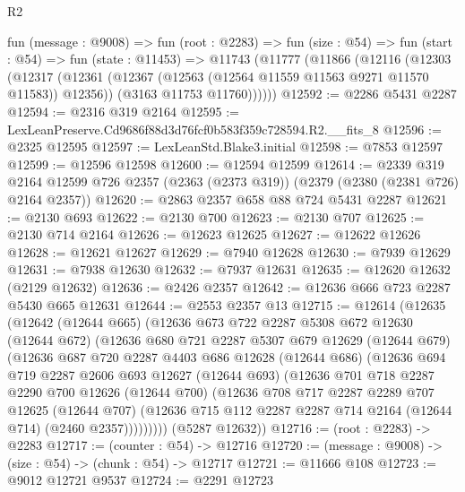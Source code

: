 \begin{lexlean}{R2}
\begin{coremodule}
  fun (message : @9008) =>
  fun (root : @2283) =>
  fun (size : @54) =>
  fun (start : @54) =>
  fun (state : @11453) =>
  @11743
    (@11777
      (@11866
        (@12116
          (@12303
            (@12317
              (@12361 (@12367 (@12563 (@12564 @11559 @11563 @9271 @11570 @11583)) @12356))
              (@3163 @11753 @11760))))))
@12592 := @2286 @5431 @2287
@12594 := @2316 @319 @2164
@12595 := LexLeanPreserve.Cd9686f88d3d76fcf0b583f359c728594.R2.__fits_8
@12596 := @2325 @12595
@12597 := LexLeanStd.Blake3.initial
@12598 := @7853 @12597
@12599 := @12596 @12598
@12600 := @12594 @12599
@12614 := @2339
    @319
    @2164
    @12599
    @726
    @2357
    (@2363 (@2373 @319))
    (@2379 (@2380 (@2381 @726) @2164 @2357))
@12620 := @2863 @2357 @658 @88 @724 @5431 @2287
@12621 := @2130 @693
@12622 := @2130 @700
@12623 := @2130 @707
@12625 := @2130 @714 @2164
@12626 := @12623 @12625
@12627 := @12622 @12626
@12628 := @12621 @12627
@12629 := @7940 @12628
@12630 := @7939 @12629
@12631 := @7938 @12630
@12632 := @7937 @12631
@12635 := @12620 @12632 (@2129 @12632)
@12636 := @2426 @2357
@12642 := @12636 @666 @723 @2287 @5430 @665 @12631
@12644 := @2553 @2357 @13
@12715 := @12614
    (@12635
      (@12642
        (@12644 @665)
        (@12636
          @673
          @722
          @2287
          @5308
          @672
          @12630
          (@12644 @672)
          (@12636
            @680
            @721
            @2287
            @5307
            @679
            @12629
            (@12644 @679)
            (@12636
              @687
              @720
              @2287
              @4403
              @686
              @12628
              (@12644 @686)
              (@12636
                @694
                @719
                @2287
                @2606
                @693
                @12627
                (@12644 @693)
                (@12636
                  @701
                  @718
                  @2287
                  @2290
                  @700
                  @12626
                  (@12644 @700)
                  (@12636
                    @708
                    @717
                    @2287
                    @2289
                    @707
                    @12625
                    (@12644 @707)
                    (@12636 @715 @112 @2287 @2287 @714 @2164 (@12644 @714) (@2460 @2357)))))))))
      (@5287 @12632))
@12716 := (root : @2283) -> @2283
@12717 := (counter : @54) -> @12716
@12720 := (message : @9008) -> (size : @54) -> (chunk : @54) -> @12717
@12721 := @11666 @108
@12723 := @9012 @12721 @9537
@12724 := @2291 @12723

\end{coremodule}
\end{lexlean}
